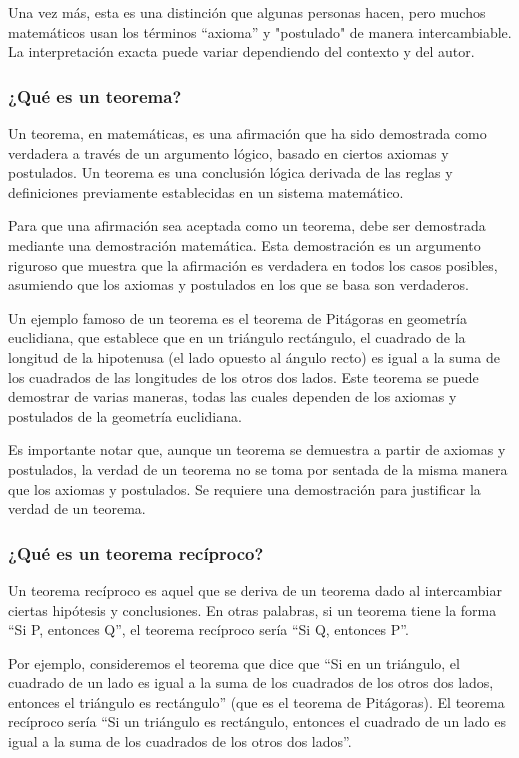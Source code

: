 Una vez más, esta es una distinción que algunas personas hacen, pero muchos matemáticos usan los términos ``axioma'' y "postulado" de manera intercambiable. La interpretación exacta puede variar dependiendo del contexto y del autor.

\subsubsection{¿Qué es un teorema?}

Un teorema, en matemáticas, es una afirmación que ha sido demostrada como verdadera a través de un argumento lógico, basado en ciertos axiomas y postulados. Un teorema es una conclusión lógica derivada de las reglas y definiciones previamente establecidas en un sistema matemático.

Para que una afirmación sea aceptada como un teorema, debe ser demostrada mediante una demostración matemática. Esta demostración es un argumento riguroso que muestra que la afirmación es verdadera en todos los casos posibles, asumiendo que los axiomas y postulados en los que se basa son verdaderos.

Un ejemplo famoso de un teorema es el teorema de Pitágoras en geometría euclidiana, que establece que en un triángulo rectángulo, el cuadrado de la longitud de la hipotenusa (el lado opuesto al ángulo recto) es igual a la suma de los cuadrados de las longitudes de los otros dos lados. Este teorema se puede demostrar de varias maneras, todas las cuales dependen de los axiomas y postulados de la geometría euclidiana.

Es importante notar que, aunque un teorema se demuestra a partir de axiomas y postulados, la verdad de un teorema no se toma por sentada de la misma manera que los axiomas y postulados. Se requiere una demostración para justificar la verdad de un teorema.

\subsubsection{¿Qué es un teorema recíproco?}

Un teorema recíproco es aquel que se deriva de un teorema dado al intercambiar ciertas hipótesis y conclusiones. En otras palabras, si un teorema tiene la forma ``Si P, entonces Q'', el teorema recíproco sería ``Si Q, entonces P''.

Por ejemplo, consideremos el teorema que dice que ``Si en un triángulo, el cuadrado de un lado es igual a la suma de los cuadrados de los otros dos lados, entonces el triángulo es rectángulo'' (que es el teorema de Pitágoras). El teorema recíproco sería ``Si un triángulo es rectángulo, entonces el cuadrado de un lado es igual a la suma de los cuadrados de los otros dos lados''.

